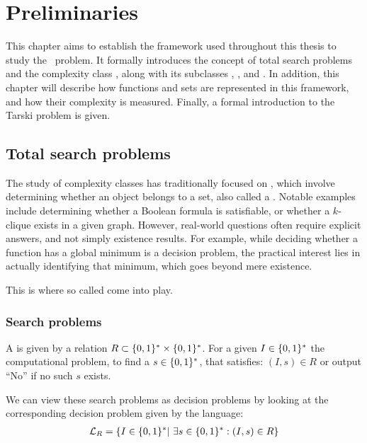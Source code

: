 \setchapterpreamble[u]{\margintoc}
\chapter{Preliminaries}

This chapter aims to establish the framework used throughout this thesis to study the \Tarski\ problem. It formally introduces the concept of total search problems and the complexity class \TFNP, along with its subclasses \PLS, \PPAD, and \EOPL. In addition, this chapter will describe how functions and sets are represented in this framework, and how their complexity is measured. Finally, a formal introduction to the Tarski problem is given.

\section{Total search problems}

The study of complexity classes has traditionally focused on , which involve determining whether an object belongs to a set, also called a . Notable examples include determining whether a Boolean formula is satisfiable, or whether a $k$-clique exists in a given graph. However, real-world questions often require explicit answers, and not simply existence results. For example, while deciding whether a function has a global minimum is a decision problem, the practical interest lies in actually identifying that minimum, which goes beyond mere existence.

This is where so called  come into play.

\subsection{Search problems}

\begin{definition}
    A  is given by a relation $R\subset \{0, 1\}^* \times \{0, 1\}^*$. For a given  $I\in \{0, 1\}^*$ the computational problem, to find a  $s \in \{0, 1\}^*$, that satisfies: $(I, s) \in R$ or output ``No'' if no such $s$ exists.
\end{definition}

We can view these search problems as decision problems by looking at the corresponding decision problem given by the language:
\begin{align*}
    \mathcal{L}_R = \{ I \in \{0, 1\}^* |\ \exists s \in \{0, 1\}^* : (I, s) \in R\}
\end{align*}

